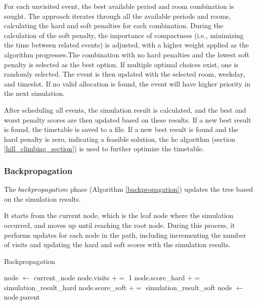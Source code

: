 For each unvisited event, the best available period and room combination is sought. The approach iterates through all the available periods and rooms, calculating the hard and soft penalties for each combination. During the calculation of the soft penalty, the importance of compactness (i.e., minimizing the time between related events) is adjusted, with a higher weight applied as the algorithm progresses.The combination with no hard penalties and the lowest soft penalty is selected as the best option. If multiple optimal choices exist, one is randomly selected. The event is then updated with the selected room, weekday, and timeslot. If no valid allocation is found, the event will have higher priority in the next simulation.

After scheduling all events, the simulation result is calculated, and the best and worst penalty scores are then updated based on these results. If a new best result is found, the timetable is saved to a file. If a new best result is found and the hard penalty is zero, indicating a feasible solution, the \ac{hc} algorithm (section \ref{hill_climbing_section}) is used to further optimize the timetable.

\subsubsection{Backpropagation}

The \(backpropagation\) phase (Algorithm \ref{backpropagation}) updates the tree based on the simulation results. 

It starts from the current node, which is the leaf node where the simulation occurred, and moves up until reaching the root node. During this process, it performs updates for each node in the path, including incrementing the number of visits and updating the hard and soft scores with the simulation results. 

\begin{algorithm}
\caption{Backpropagation}\label{backpropagation}
\begin{algorithmic}[1]
    \State node $\gets$ current\_node
        \State node.visits $+=$ 1
        \State node.score\_hard $+=$ simulation\_result\_hard
        \State node.score\_soft $+=$ simulation\_result\_soft
        \State node $\gets$ node.parent
    \EndWhile
\EndFunction
\end{algorithmic}
\end{algorithm}

